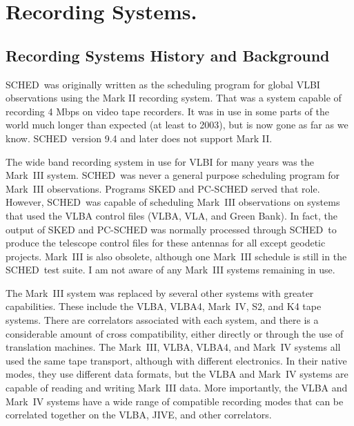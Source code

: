 \documentclass{report}
\newcommand{\schedb}{{\sc SCHED~}}
\begin{document}
\section{\label{SEC:RECSYS}Recording Systems.}

\subsection{\label{SSEC:RECBAK}Recording Systems History and Background}

\schedb was originally written as the scheduling program for global
VLBI observations using the Mark II recording system.  That was a
system capable of recording 4 Mbps on video tape recorders.  It was
in use in some parts of the world much longer than expected (at least
to 2003), but is now gone as far as we know.  \schedb version 9.4 and
later does not support Mark II.

The wide band recording system in use for VLBI for many years was
the Mark~III system.  \schedb was never a general purpose scheduling
program for Mark~III observations.  Programs {\sc SKED} and {\sc PC-SCHED}
served that role.  However, \schedb was capable of scheduling Mark~III
observations on systems that used the VLBA control files (VLBA, VLA, and
Green Bank).  In fact, the output of {\sc SKED} and {\sc PC-SCHED} was
normally processed through \schedb to produce the telescope control files
for these antennas for all except geodetic projects.  Mark~III is also
obsolete, although one Mark~III schedule is still in the \schedb test
suite.  I am not aware of any Mark~III systems remaining in use.

The Mark~III system was replaced by several other systems with greater
capabilities.  These include the VLBA, VLBA4, Mark~IV, S2, and K4 tape
systems.  There are correlators associated with each system, and there
is a considerable amount of cross compatibility, either directly or
through the use of translation machines.  The Mark~III, VLBA, VLBA4,
and Mark~IV systems all used the same tape transport, although with
different electronics.  In their native modes, they use different data
formats, but the VLBA and Mark~IV systems are capable of reading and
writing Mark~III data.  More importantly, the VLBA and Mark~IV systems
have a wide range of compatible recording modes that can be correlated
together on the VLBA, JIVE, and other correlators.
\end{document}
